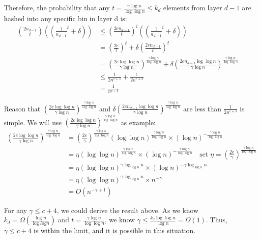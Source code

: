 \documentclass[a4paper, english]{paper}
\begin{document}
 Therefore, the probability that any $t = \frac{\gamma\log n}{\log \log n}\le k_d$ elements from layer $d-1$ are hashed into any specific bin in layer d is:
\begin{align*}
{2n_{d-1}\choose t} \left((\frac1{n_{d-1}}^t+\delta)\right)&\le (\frac{2en_{d-1}}{t})^t\left((\frac1{n_{d-1}}^t+\delta)\right)\\
& = (\frac{2e}t)^t+\delta\left( \frac{2en_{d-1}}{t}\right)^t\\
& = (\frac{2e\log\log n}{\gamma\log n})^{\frac{\gamma\log n}{\log \log n}}+\delta\left( \frac{2en_{d-1}\log\log n}{\gamma\log n}\right)^{\frac{\gamma\log n}{\log \log n}}\\
& \le \frac1{2n^{c+3}}+\frac1{2n^{c+3}}\\
& = \frac1{n^{c+3}}
\end{align*}\par
 Reason that $(\frac{2e\log\log n}{\gamma\log n})^{\frac{\gamma\log n}{\log \log n}}$ and $\delta\left( \frac{2en_{d-1}\log\log n}{\gamma\log n}\right)^{\frac{\gamma\log n}{\log \log n}}$ are less than $\frac1{2n^{c+3}}$ is simple. We will use $(\frac{2e\log\log n}{\gamma\log n})^{\frac{\gamma\log n}{\log \log n}}$ as example:
\begin{align*}
(\frac{2e\log\log n}{\gamma\log n})^{\frac{\gamma\log n}{\log \log n}} &= (\frac{2e}{\gamma})^{\frac{\gamma\log n}{\log \log n}}(\log\log n)^{\frac{\gamma\log n}{\log \log n}}\times(\log n)^{-\frac{\gamma\log n}{\log \log n}}\\
&= \eta(\log\log n)^{\frac{\gamma\log n}{\log \log n}}\times(\log n)^{-\frac{\gamma\log n}{\log \log n}}\quad\text{set }\eta=(\frac{2e}{\gamma})^{\frac{\gamma\log n}{\log \log n}}\\
&=\eta (\log\log n)^{\gamma\log_{\log n} n}\times(\log n)^{-\gamma\log_{\log n} n}\\
&= \eta (\log\log n)^{\gamma\log_{\log n} n}\times n^{-\gamma}\\
&= O(n^{-\gamma+1})
\end{align*}\par
 For any $\gamma\le c+4$, we could derive the result above. As we know $k_d = \Omega(\frac{\log n}{\log log n})$ and $t = \frac{\gamma\log n}{\log\log n}$, we know $\gamma\le \frac{k_d\log\log n}{\log n} = \Omega(1)$. Thus, $\gamma\le c+4$ is within the limit, and it is possible in this situation.\\
\end{document}
